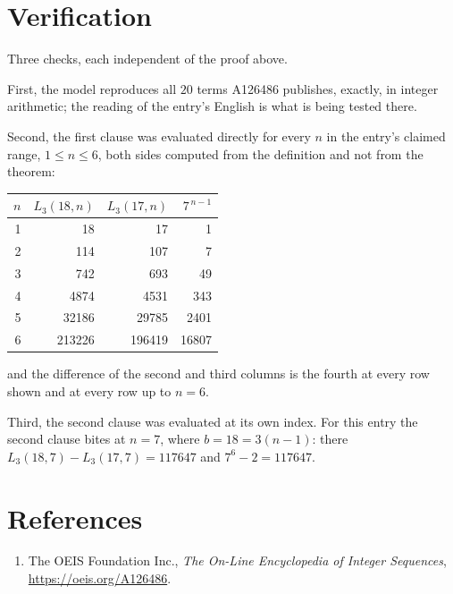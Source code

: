 \documentclass[11pt,a4paper]{article}
\theoremstyle{plain}
\theoremstyle{definition}
\begin{document}
\section{Verification}

Three checks, each independent of the proof above.

First, the model reproduces all $20$ terms A126486 publishes, exactly, in integer
arithmetic; the reading of the entry's English is what is being tested there.

Second, the first clause was evaluated directly for every $n$ in the entry's claimed range,
$1\le n\le6$, both sides computed from the definition and not from the theorem:

\begin{center}
\begin{tabular}{rrrr}
$n$ & $L_{3}(18,n)$ & $L_{3}(17,n)$ & $7^{\,n-1}$ \\ \hline
1 & 18 & 17 & 1 \\
2 & 114 & 107 & 7 \\
3 & 742 & 693 & 49 \\
4 & 4874 & 4531 & 343 \\
5 & 32186 & 29785 & 2401 \\
6 & 213226 & 196419 & 16807 \\
\end{tabular}
\end{center}

\noindent and the difference of the second and third columns is the fourth at every row shown
and at every row up to $n=6$.

Third, the second clause was evaluated at its own index. For this entry the second clause bites at $n=7$, where $b=18=3(n-1)$: there $L_{3}(18,7)-L_{3}(17,7)=117647$ and $7^{6}-2=117647$.

\section*{References}
\begin{enumerate}
\item The OEIS Foundation Inc., \emph{The On-Line Encyclopedia of Integer Sequences},
\url{https://oeis.org/A126486}.
\end{enumerate}
\end{document}
